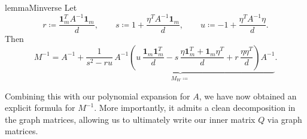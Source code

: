 \documentclass[12pt]{article}
\def\1{\bm{1}}
\newtheorem{lemma}[theorem]{Lemma}
\newcommand\numberthis{\addtocounter{equation}{1}\tag{\theequation}}
\newcommand{\Authornote}[3]{{\sf\footnotesize\color{#3}{[#1: #2]}}}
\newcommand{\Authornote}[3]{}
\newcommand{\jnote}[1]{\Authornote{Jeff}{#1}{blue}}
\begin{document}
%
\begin{restatable}{lemma}{Minverse} \label{lem:M-inverse} Let \[ r\coloneqq \frac{\1_m^T A^{-1}\1_m}{d}, \qquad s\coloneqq 1+\frac{\eta^T A^{-1}\1_m}{d}, \qquad u\coloneqq -1+\frac{\eta^T A^{-1}\eta}{d}. \] Then \begin{equation} \label{eq:M-inverse} M^{-1} = A^{-1} + \underbrace{ \frac{1}{s^2-ru}\, A^{-1} \left( u\,\frac{\1_m\1_m^T}{d} - s\,\frac{\eta\1_m^T+\1_m\eta^T}{d} + r\,\frac{ \eta\eta^T}{d} \right) A^{-1}}_{M_W \coloneqq}. \end{equation} \end{restatable}

Combining this with our polynomial expansion for $A$, we have now obtained an explicit formula for $M^{-1}$. More importantly, it admits a clean decomposition in the graph matrices, allowing us to ultimately write our inner matrix $Q$ via graph matrices.
\jnote{i moved basically all the technical discussion of Woodbury to the later section, but leave here the expression for M inverse. This looks fairly clean to me now.}
\end{document}
